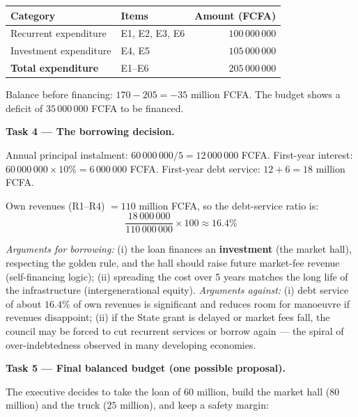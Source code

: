 \documentclass[11pt]{article}
\newcommand{\cle}[1]{{\popxbold\color{popdark}#1}}
\begin{document}
\begin{center}
\begin{tabularx}{\linewidth}{|l|X|r|}
\hline
\rowcolor{popblueL} \textbf{Category} & \textbf{Items} & \textbf{Amount (FCFA)} \\
\hline
Recurrent expenditure & E1, E2, E3, E6 & $100\,000\,000$ \\
\hline
Investment expenditure & E4, E5 & $105\,000\,000$ \\
\hline
\textbf{Total expenditure} & E1--E6 & $205\,000\,000$ \\
\hline
\end{tabularx}
\end{center}

Balance before financing: $170 - 205 = -35$ million FCFA. The budget shows a \cle{deficit} of $35\,000\,000$ FCFA to be financed.

\textbf{Task 4 — The borrowing decision.}

Annual principal instalment: $60\,000\,000 / 5 = 12\,000\,000$ FCFA. First-year interest: $60\,000\,000 \times 10\% = 6\,000\,000$ FCFA. First-year debt service: $12 + 6 = 18$ million FCFA.

Own revenues (R1--R4) $= 110$ million FCFA, so the debt-service ratio is:
\[ \frac{18\,000\,000}{110\,000\,000} \times 100 \approx 16.4\% \]

\emph{Arguments for borrowing:} (i) the loan finances an \textbf{investment} (the market hall), respecting the golden rule, and the hall should raise future market-fee revenue (self-financing logic); (ii) spreading the cost over 5 years matches the long life of the infrastructure (intergenerational equity). \emph{Arguments against:} (i) debt service of about $16.4\%$ of own revenues is significant and reduces room for manoeuvre if revenues disappoint; (ii) if the State grant is delayed or market fees fall, the council may be forced to cut recurrent services or borrow again — the spiral of over-indebtedness observed in many developing economies.

\textbf{Task 5 — Final balanced budget (one possible proposal).}

The executive decides to take the loan of $60$ million, build the market hall ($80$ million) and the truck ($25$ million), and keep a safety margin:
\end{document}
